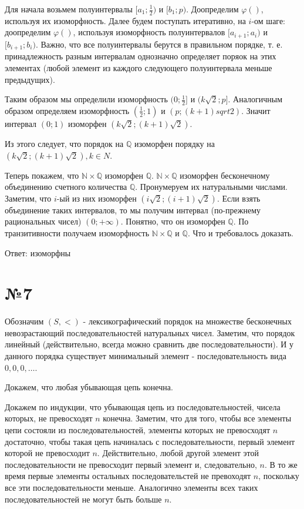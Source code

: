 \documentclass[12pt]{article}
\begin{document}
	Для начала возьмем полуинтервалы $[a_1; \frac{1}{2})$ 
	и $[b_1; p)$. Доопределим $\varphi()$, используя их изоморфность. Далее будем поступать итеративно, на $i$-ом шаге: %
	доопределим $\varphi()$, используя изоморфность полуинтервалов $[a_{i + 1}; a_i)$ и $[b_{i + 1}; b_i)$. Важно, что все полуинтервалы берутся в правильном порядке, т. е. принадлежность разным интервалам однозначно определяет поряок на этих элементах (любой элемент из каждого следующего полуинтервала меньше предыдущих).
	
	Таким образом мы определили изоморфность $(0; \frac{1}{2}]$ и $(k\sqrt{2}; p]$. Аналогичным образом определяем изоморфность $(\frac{1}{2}; 1)$ и $(p; (k + 1)sqrt{2})$. Значит интервал $(0; 1)$ изоморфен $(k\sqrt{2}; (k + 1)\sqrt{2})$.
	
	Из этого следует, что порядок на $\mathbb{Q}$ изоморфен порядку на $(k\sqrt{2}; (k + 1)\sqrt{2}), k \in N$.
	
	Теперь покажем, что $\mathbb{N} \times \mathbb{Q}$ изоморфен $\mathbb{Q}$. 
	$\mathbb{N} \times \mathbb{Q}$ изоморфен бесконечному объединению счетного количества $\mathbb{Q}$. Пронумеруем их натуральными числами. Заметим, что $i$-ый из них изоморфен $(i\sqrt{2}; (i + 1)\sqrt{2})$. Если взять объединение таких интервалов, то мы получим интервал (по-прежнему рациональных чисел) $(0; +\infty)$. Понятно, что он изоморфен $\mathbb{Q}$. По транзитивности получаем изоморфность $\mathbb{N} \times \mathbb{Q}$ и $\mathbb{Q}$. Что и требовалось доказать.
	
	Ответ: изоморфны	
	

	\section*{№7}
	Обозначим $(S, <)$ - лексикографический порядок на множестве бесконечных невозрастающий последовательностей натуральных чисел. Заметим, что порядок линейный (действительно, всегда можно сравнить две последовательности). И у данного порядка существует минимальный элемент - последовательность вида $0, 0, 0, \dots$. 
	
	Докажем, что любая убывающая цепь конечна.
	
	Докажем по индукции, что убывающая цепь из последовательностей, чисела которых, не превосходят $n$ конечна. Заметим, что для того, чтобы все элементы цепи состояли из последовательностей, элементы которых не превосходят $n$ достаточно, чтобы такая цепь начиналась с последовательности, первый элемент которой не превосходит $n$. Действительно, любой другой элемент этой последовательности не превосходит первый элемент и, следовательно, $n$. В то же время первые элементы остальных последовательстей не превоходят $n$, поскольку все эти последовательности меньше. Аналогично элементы всех таких последовательностей не могут быть больше $n$.
	
\end{document}
